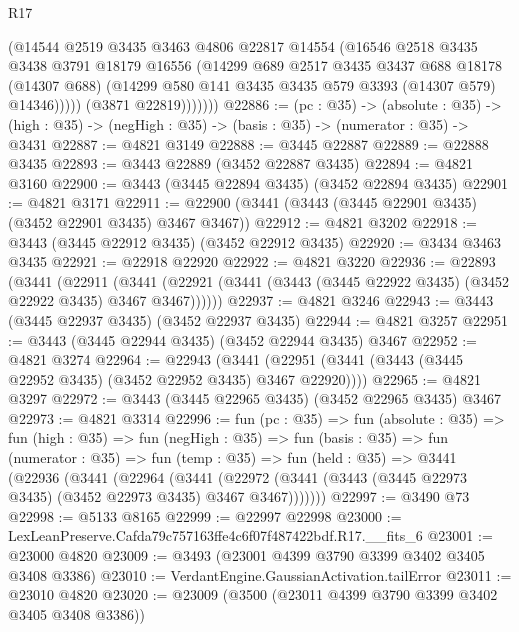 \begin{lexlean}{R17}
\begin{coremodule}
                  (@14544
                    @2519
                    @3435
                    @3463
                    @4806
                    @22817
                    @14554
                    (@16546
                      @2518
                      @3435
                      @3438
                      @3791
                      @18179
                      @16556
                      (@14299
                        @689
                        @2517
                        @3435
                        @3437
                        @688
                        @18178
                        (@14307 @688)
                        (@14299 @580 @141 @3435 @3435 @579 @3393 (@14307 @579) @14346)))))
                (@3871 @22819)))))))
@22886 := (pc : @35) ->
  (absolute : @35) -> (high : @35) -> (negHigh : @35) -> (basis : @35) -> (numerator : @35) -> @3431
@22887 := @4821 @3149
@22888 := @3445 @22887
@22889 := @22888 @3435
@22893 := @3443 @22889 (@3452 @22887 @3435)
@22894 := @4821 @3160
@22900 := @3443 (@3445 @22894 @3435) (@3452 @22894 @3435)
@22901 := @4821 @3171
@22911 := @22900 (@3441 (@3443 (@3445 @22901 @3435) (@3452 @22901 @3435) @3467 @3467))
@22912 := @4821 @3202
@22918 := @3443 (@3445 @22912 @3435) (@3452 @22912 @3435)
@22920 := @3434 @3463 @3435
@22921 := @22918 @22920
@22922 := @4821 @3220
@22936 := @22893
    (@3441
      (@22911
        (@3441 (@22921 (@3441 (@3443 (@3445 @22922 @3435) (@3452 @22922 @3435) @3467 @3467))))))
@22937 := @4821 @3246
@22943 := @3443 (@3445 @22937 @3435) (@3452 @22937 @3435)
@22944 := @4821 @3257
@22951 := @3443 (@3445 @22944 @3435) (@3452 @22944 @3435) @3467
@22952 := @4821 @3274
@22964 := @22943
    (@3441 (@22951 (@3441 (@3443 (@3445 @22952 @3435) (@3452 @22952 @3435) @3467 @22920))))
@22965 := @4821 @3297
@22972 := @3443 (@3445 @22965 @3435) (@3452 @22965 @3435) @3467
@22973 := @4821 @3314
@22996 := fun (pc : @35) =>
  fun (absolute : @35) =>
  fun (high : @35) =>
  fun (negHigh : @35) =>
  fun (basis : @35) =>
  fun (numerator : @35) =>
  fun (temp : @35) =>
  fun (held : @35) =>
  @3441
    (@22936
      (@3441
        (@22964
          (@3441 (@22972 (@3441 (@3443 (@3445 @22973 @3435) (@3452 @22973 @3435) @3467 @3467)))))))
@22997 := @3490 @73
@22998 := @5133 @8165
@22999 := @22997 @22998
@23000 := LexLeanPreserve.Cafda79c757163ffe4c6f07f487422bdf.R17.__fits_6
@23001 := @23000 @4820
@23009 := @3493 (@23001 @4399 @3790 @3399 @3402 @3405 @3408 @3386)
@23010 := VerdantEngine.GaussianActivation.tailError
@23011 := @23010 @4820
@23020 := @23009 (@3500 (@23011 @4399 @3790 @3399 @3402 @3405 @3408 @3386))

\end{coremodule}
\end{lexlean}
